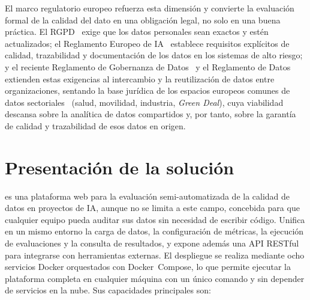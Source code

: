 El marco regulatorio europeo refuerza esta dimensión y convierte la
evaluación formal de la calidad del dato en una obligación legal, no solo en una
buena práctica.  El \ac{RGPD}~\citep{rgpd2016} exige que los datos
personales sean exactos y estén actualizados; el Reglamento Europeo de
\ac{IA}~\citep{aiact2024} establece requisitos explícitos de calidad,
trazabilidad y documentación de los datos en los sistemas de alto riesgo;
y el reciente Reglamento de Gobernanza de Datos~\citep{dga2022} y el
Reglamento de Datos~\citep{dataact2023} extienden estas exigencias al
intercambio y la reutilización de datos entre organizaciones, sentando la
base jurídica de los espacios europeos comunes de datos
sectoriales~\citep{eudataspaces2020} (salud, movilidad, industria,
\emph{Green Deal}), cuya viabilidad descansa sobre la analítica de datos
compartidos y, por tanto, sobre la garantía de calidad y trazabilidad de
esos datos en origen.


\section{Presentación de la solución}
\label{sec:solucion}

\dataqual es una plataforma web para la evaluación semi-automatizada de la
calidad de datos en proyectos de \ac{IA}, aunque no se limita a este campo,
concebida para que cualquier equipo pueda auditar sus datos sin necesidad de
escribir código.
Unifica en un mismo entorno la carga de datos, la configuración de métricas,
la ejecución de evaluaciones y la consulta de resultados, y expone además una
\ac{API} \ac{REST}ful~\citep{fielding2000} para integrarse con herramientas
externas.  El despliegue se realiza mediante ocho servicios Docker orquestados
con Docker~Compose, lo que permite ejecutar la plataforma completa en
cualquier máquina con un único comando y sin depender de servicios en la nube.
Sus capacidades principales son:

